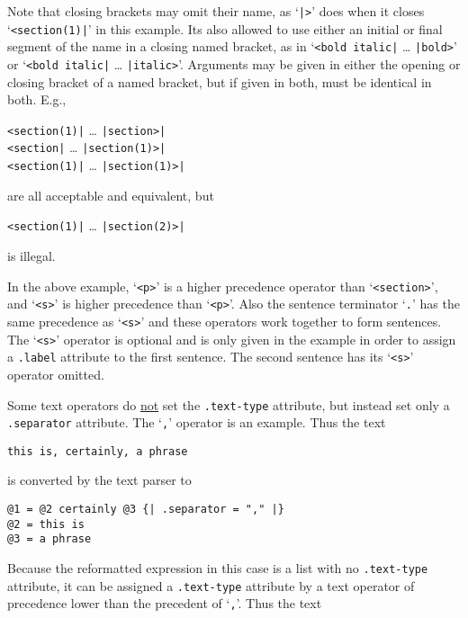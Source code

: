 \documentclass[12pt]{article}
\newenvironment{indpar}[1][0.3in]%
	{\begin{list}{}%
		     {\setlength{\itemsep}{0in}%
		      \setlength{\topsep}{0in}%
		      \setlength{\parsep}{1ex}%
		      \setlength{\labelwidth}{#1}%
		      \setlength{\leftmargin}{#1}%
		      \addtolength{\leftmargin}{\labelsep}}%
	 \item}%
	{\end{list}}
\begin{document}
Note that closing brackets may omit their name, as `\verb/|>/' does
when it closes `\verb/<section(1)|/' in this example.  Its also allowed to
use either an initial or final segment of the name in a closing
named bracket, as in `\verb/<bold italic|/ \ldots{} \verb/|bold>/'
or `\verb/<bold italic|/ \ldots{} \verb/|italic>/'.
Arguments may be given in either the opening or closing bracket of a named
bracket, but if given in both, must be identical in both.  E.g.,
\begin{center}
\verb/<section(1)|/ \ldots{} \verb/|section>|/ \\
\verb/<section|/ \ldots{} \verb/|section(1)>|/ \\
\verb/<section(1)|/ \ldots{} \verb/|section(1)>|/ \\
\end{center}
are all acceptable and equivalent, but
\begin{center}
\verb/<section(1)|/ \ldots{} \verb/|section(2)>|/
\end{center}
is illegal.


In the above example,
`\verb/<p>/' is a higher precedence operator than `\verb/<section>/', and
`\verb/<s>/' is higher precedence than `\verb/<p>/'.  Also the sentence
terminator `\verb/./' has the same precedence as `\verb/<s>/' and these
operators work together to form sentences.  The `\verb/<s>/' operator
is optional and is only given in the example in order to assign a {\tt .label}
attribute to the first sentence.  The second sentence has its `\verb/<s>/'
operator omitted.

Some text operators do \underline{not} set the {\tt .text-type} attribute,
but instead set only a {\tt .separator} attribute.  The `\verb|,|'
operator is an example.  Thus the text

\begin{indpar}\begin{verbatim}
this is, certainly, a phrase
\end{verbatim}\end{indpar}

is converted by the text parser to

\begin{indpar}\begin{verbatim}
@1 = @2 certainly @3 {| .separator = "," |}
@2 = this is
@3 = a phrase
\end{verbatim}\end{indpar}

Because the reformatted expression in this case is a list with
no {\tt .text-type} attribute, it can be assigned a {\tt .text-type}
attribute by a text operator of precedence lower than the
precedent of `\verb|,|'.  Thus the text
\end{document}
